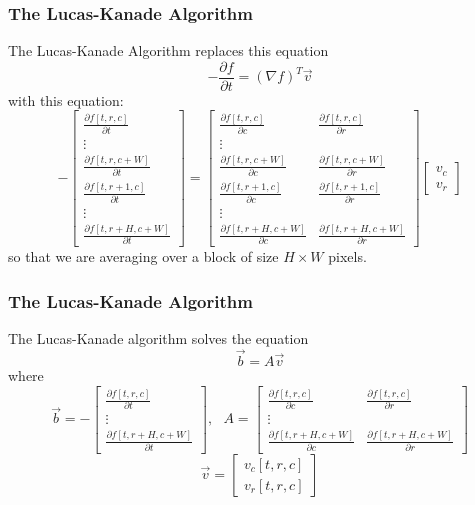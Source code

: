 \documentclass{beamer}
\begin{document}
\begin{frame}
  \frametitle{The Lucas-Kanade Algorithm}

  The Lucas-Kanade Algorithm replaces this equation
  \[
  -\frac{\partial f}{\partial t} =(\nabla f)^T\vec{v}
  \]
  with this equation:
  \[
  -\left[\begin{array}{c}
      \frac{\partial f[t,r,c]}{\partial t}\\
      \vdots\\
      \frac{\partial f[t,r,c+W]}{\partial t}\\
      \frac{\partial f[t,r+1,c]}{\partial t}\\
      \vdots\\
      \frac{\partial f[t,r+H,c+W]}{\partial t}
    \end{array}\right]
  =
  \left[\begin{array}{cc}
      \frac{\partial f[t,r,c]}{\partial c}&\frac{\partial f[t,r,c]}{\partial r}\\
      \vdots\\
      \frac{\partial f[t,r,c+W]}{\partial c}&\frac{\partial f[t,r,c+W]}{\partial r}\\
      \frac{\partial f[t,r+1,c]}{\partial c}&\frac{\partial f[t,r+1,c]}{\partial r}\\
      \vdots\\
      \frac{\partial f[t,r+H,c+W]}{\partial c}&\frac{\partial f[t,r+H,c+W]}{\partial r}
    \end{array}\right]
  \left[\begin{array}{c}v_c\\ v_r\end{array}\right]
  \]
  so that we are averaging over a block of size $H\times W$ pixels.
\end{frame}

\begin{frame}
  \frametitle{The Lucas-Kanade Algorithm}

  The Lucas-Kanade algorithm solves the equation
  \[\vec{b}=A\vec{v} \]
  where
  \[
  \vec{b} = -\left[\begin{array}{c}
      \frac{\partial f[t,r,c]}{\partial t}\\
      \vdots\\
      \frac{\partial f[t,r+H,c+W]}{\partial t}
    \end{array}\right],~~~
  A=\left[\begin{array}{cc}
      \frac{\partial f[t,r,c]}{\partial c}&\frac{\partial f[t,r,c]}{\partial r}\\
      \vdots\\
      \frac{\partial f[t,r+H,c+W]}{\partial c}&\frac{\partial f[t,r+H,c+W]}{\partial r}
    \end{array}\right]
  \]
  \[
  \vec{v}=\left[\begin{array}{c}v_c[t,r,c]\\ v_r[t,r,c]\end{array}\right]
  \]
\end{frame}
\end{document}
